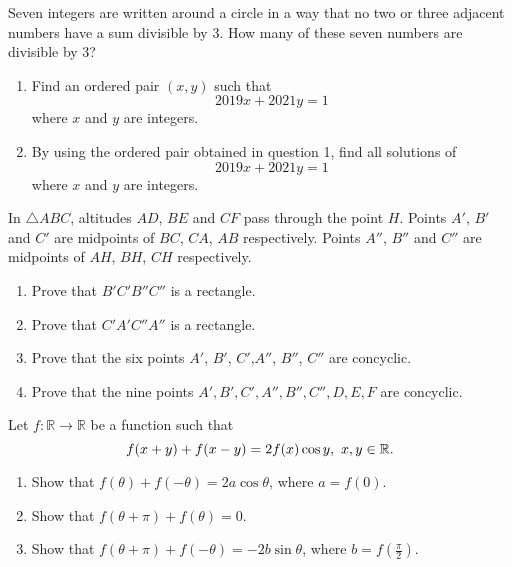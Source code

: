 \begin{problems}
    \problem Seven integers are written around a circle in a way that no two or
    three adjacent numbers have a sum divisible by 3. How many of these seven
    numbers are divisible by 3? 
    
    \problem 
    \begin{enumerate}
        \item Find an ordered pair $(x,y)$ such that \[2019x + 2021y = 1\]
            where $x$ and $y$ are integers. 

        \item By using the ordered pair obtained in question 1, find all
            solutions of 
            \[2019x + 2021y = 1\] 
            where $x$ and $y$ are integers. 
    \end{enumerate}
    
    \problem In $\triangle ABC$, altitudes $AD$, $BE$ and $CF$ pass through the
    point $H$. Points $A'$, $B'$ and $C'$ are midpoints of $BC$, $CA$, $AB$
    respectively. Points $A''$, $B''$ and $C''$ are midpoints of $AH$, $BH$,
    $CH$ respectively. 
    \begin{enumerate}
        \item Prove that $B'C'B''C''$ is a rectangle. 
        
        \item Prove that $C'A'C''A''$ is a rectangle.
        
        \item Prove that the six points $A'$, $B'$, $C'$,$A''$, $B''$, $C''$
            are concyclic. 
        
        \item Prove that the nine points $A',B',C',A'',B'',C'',D,E,F$ are
            concyclic. 
    \end{enumerate}
    
    \problem Let $f:\mathbb{R} \rightarrow \mathbb{R}$ be a function such that 
    \[f(x + y) + f(x - y) = 2f(x)\cos y,\text{\space} x, y \in \mathbb{R}.\]
    \begin{enumerate}
        \item Show that $f(\theta) + f(-\theta) = 2a\cos \theta$, where $a =
            f(0)$. 
        
        \item Show that $f(\theta + \pi) + f(\theta) = 0$.
        
        \item Show that $f(\theta + \pi) + f(-\theta) = -2b\sin\theta$, where
            $b = f\left(\frac{\pi}{2}\right)$.
        

\end{enumerate}
\end{problems}

